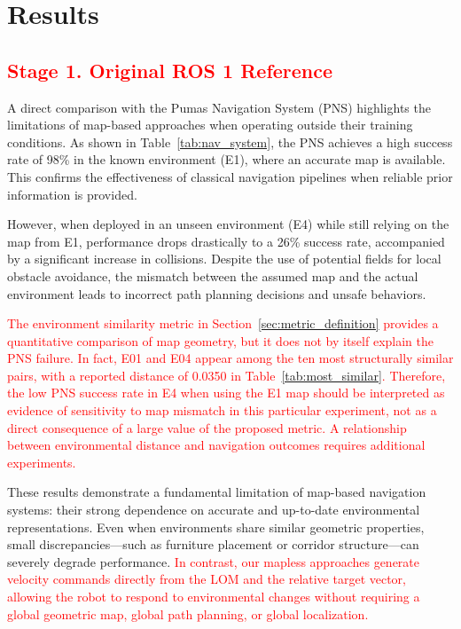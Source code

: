 \documentclass[robotics,article,submit,pdftex,moreauthors]{Definitions/mdpi}
\begin{document}
\section{Results}\label{sec:Results}

\subsection{\texorpdfstring{\textcolor{red}{Stage 1. Original ROS 1 Reference}}{Stage 1. Original ROS 1 Reference}}\label{subsec:stage1_results}

A direct comparison with the Pumas Navigation System (PNS) highlights the limitations of map-based approaches when operating outside their training conditions. As shown in Table~\ref{tab:nav_system}, the PNS achieves a high success rate of 98\% in the known environment (E1), where an accurate map is available. This confirms the effectiveness of classical navigation pipelines when reliable prior information is provided.

However, when deployed in an unseen environment (E4) while still relying on the map from E1, performance drops drastically to a 26\% success rate, accompanied by a significant increase in collisions. Despite the use of potential fields for local obstacle avoidance, the mismatch between the assumed map and the actual environment leads to incorrect path planning decisions and unsafe behaviors.

\textcolor{red}{The environment similarity metric in Section~\ref{sec:metric_definition} provides a quantitative comparison of map geometry, but it does not by itself explain the PNS failure. In fact, E01 and E04 appear among the ten most structurally similar pairs, with a reported distance of 0.0350 in Table~\ref{tab:most_similar}. Therefore, the low PNS success rate in E4 when using the E1 map should be interpreted as evidence of sensitivity to map mismatch in this particular experiment, not as a direct consequence of a large value of the proposed metric. A relationship between environmental distance and navigation outcomes requires additional experiments.}

These results demonstrate a fundamental limitation of map-based navigation systems: their strong dependence on accurate and up-to-date environmental representations. Even when environments share similar geometric properties, small discrepancies—such as furniture placement or corridor structure—can severely degrade performance. \textcolor{red}{In contrast, our mapless approaches generate velocity commands directly from the LOM and the relative target vector, allowing the robot to respond to environmental changes without requiring a global geometric map, global path planning, or global localization.}
\end{document}
